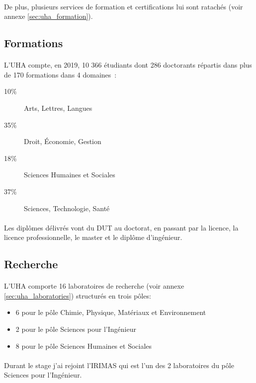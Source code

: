 \documentclass[a4paper,11pt,twoside,french,report]{../common/simplem}
\begin{document}
				\paragraph*{}
					De plus, plusieurs services de formation et certifications lui sont ratachés (voir annexe \ref{sec:uha_formation}).
			\subsection{Formations}
				\paragraph*{}
					L'UHA compte, en 2019, 10 366 étudiants dont 286 doctorants répartis dans plus de 170 formations dans 4 domaines~\cite{UHA_Chiffre_cles}:
					\begin{description}
						\item[10\%] Arts, Lettres, Langues
						\item[35\%] Droit, Économie, Gestion
						\item[18\%] Sciences Humaines et Sociales
						\item[37\%] Sciences, Technologie, Santé
					\end{description}
				\paragraph*{}
					Les diplômes délivrés vont du \gls{DUT} au doctorat, en passant par la licence, la licence professionnelle, le master et le diplôme d'ingénieur.
			\subsection{Recherche}
				\paragraph*{}
					L'\gls{UHA} comporte 16 laboratoires de recherche (voir annexe \ref{sec:uha_laboratories}) structurés en trois pôles:
					\begin{itemize}
						\item 6 pour le pôle Chimie, Physique, Matériaux et Environnement
						\item 2 pour le pôle Sciences pour l'Ingénieur
						\item 8 pour le pôle Sciences Humaines et Sociales
					\end{itemize}
				\paragraph*{}
					Durant le stage j'ai rejoint l'\gls{IRIMAS} qui est l'un des 2 laboratoires du pôle Sciences pour l'Ingénieur.
\end{document}
